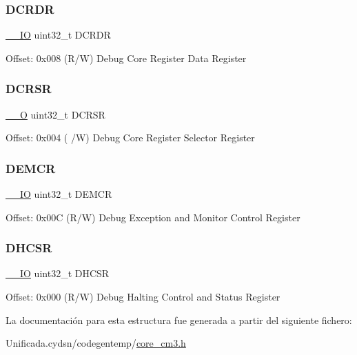 \subsubsection{\texorpdfstring{D\+C\+R\+DR}{DCRDR}}
{\footnotesize\ttfamily \mbox{\hyperlink{core__cm3_8h_aec43007d9998a0a0e01faede4133d6be}{\+\_\+\+\_\+\+IO}} uint32\+\_\+t D\+C\+R\+DR}

Offset\+: 0x008 (R/W) Debug Core Register Data Register \mbox{\label{struct_core_debug___type_a7b49cb58573da77cc8a83a1b21262180}} 
\subsubsection{\texorpdfstring{D\+C\+R\+SR}{DCRSR}}
{\footnotesize\ttfamily \mbox{\hyperlink{core__cm3_8h_a7e25d9380f9ef903923964322e71f2f6}{\+\_\+\+\_\+O}} uint32\+\_\+t D\+C\+R\+SR}

Offset\+: 0x004 ( /W) Debug Core Register Selector Register \mbox{\label{struct_core_debug___type_a6cdfc0a6ce3e988cc02c2d6e8107d193}} 
\subsubsection{\texorpdfstring{D\+E\+M\+CR}{DEMCR}}
{\footnotesize\ttfamily \mbox{\hyperlink{core__cm3_8h_aec43007d9998a0a0e01faede4133d6be}{\+\_\+\+\_\+\+IO}} uint32\+\_\+t D\+E\+M\+CR}

Offset\+: 0x00C (R/W) Debug Exception and Monitor Control Register \mbox{\label{struct_core_debug___type_a39bc5e68dc6071187fbe2348891eabfa}} 
\subsubsection{\texorpdfstring{D\+H\+C\+SR}{DHCSR}}
{\footnotesize\ttfamily \mbox{\hyperlink{core__cm3_8h_aec43007d9998a0a0e01faede4133d6be}{\+\_\+\+\_\+\+IO}} uint32\+\_\+t D\+H\+C\+SR}

Offset\+: 0x000 (R/W) Debug Halting Control and Status Register 

La documentación para esta estructura fue generada a partir del siguiente fichero\+:\begin{DoxyCompactItemize}
\item 
Unificada.\+cydsn/codegentemp/\mbox{\hyperlink{core__cm3_8h}{core\+\_\+cm3.\+h}}\end{DoxyCompactItemize}
